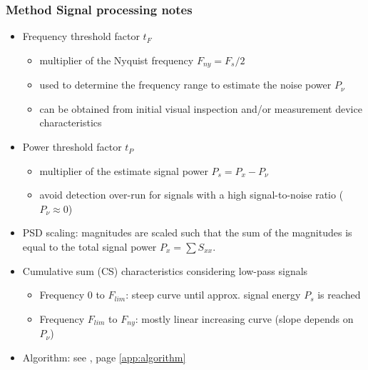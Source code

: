 \documentclass[11pt,aspectratio=169]{beamer}
\begin{document}
	\begin{frame}
		\frametitle{Method \textendash{} Signal processing notes}
		\begin{itemize}
			\item \textcolor{RIPtitlecol}{Frequency threshold factor $t_F$}
			\begin{itemize}
				\item multiplier of the Nyquist frequency $F_{ny} = F_s / 2$
				\item used to determine the frequency range to estimate the noise power $P_{\nu}$
				\item can be obtained from initial visual inspection and/or measurement device characteristics
			\end{itemize}
			\item \textcolor{RIPtitlecol}{Power threshold factor $t_P$}
			\begin{itemize}
				\item multiplier of the estimate signal power $P_s = P_x - P_{\nu}$
				\item avoid detection over-run for signals with a high signal-to-noise ratio ($P_{\nu} \approx 0$)
			\end{itemize}
			\item \textcolor{RIPtitlecol}{PSD scaling:} magnitudes are scaled such that the sum of the magnitudes is equal to the total signal power $P_x = \sum S_{xx}$.
			\item \textcolor{RIPtitlecol}{Cumulative sum (CS) characteristics considering low-pass signals}
			\begin{itemize}
				\item Frequency 0 to $F_{lim}$: steep curve until approx. signal energy $P_s$ is reached
				\item Frequency $F_{lim}$ to $F_{ny}$: mostly linear increasing curve (slope depends on $P_{\nu}$)
			\end{itemize}
			\item \textcolor{RIPtitlecol}{Algorithm:} see \appendixname, page \ref{app:algorithm}
		\end{itemize}	
	\end{frame}
\end{document}
